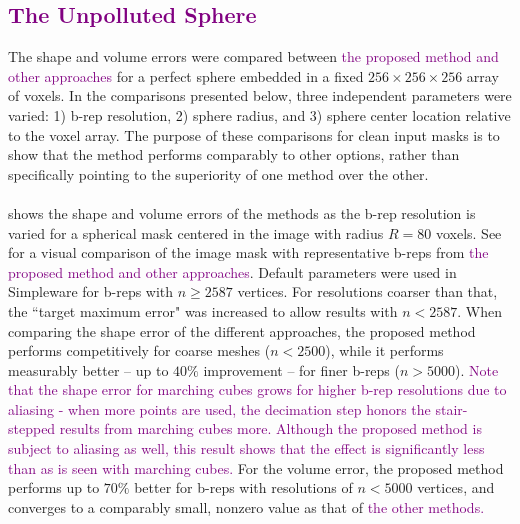 \subsection{\textcolor{purple}{The Unpolluted Sphere}}
\label{The Unpolluted Sphere}

The shape and volume errors were compared between \textcolor{purple}{the proposed method and other approaches} for a perfect sphere embedded in a fixed $256 \times 256 \times 256$ array of voxels.  In the comparisons presented below, three independent parameters were varied:  1) b-rep resolution, 2) sphere radius, and 3) sphere center location relative to the voxel array. The purpose of these comparisons for clean input masks is to show that the method performs comparably to other options, rather than specifically pointing to the superiority of one method over the other. \\ \\
%
 shows the shape and volume errors of the methods as the b-rep resolution is varied for a spherical mask centered in the image with radius $R = 80$ voxels. See~ for a visual comparison of the image mask with representative b-reps from \textcolor{purple}{the proposed method and other approaches}. Default parameters were used in Simpleware for b-reps with $n \ge 2587$ vertices. For resolutions coarser than that, the ``target maximum error" was increased to allow results with $n < 2587$. When comparing the shape error of the different approaches, the proposed method performs competitively for coarse meshes ($n < 2500$), while it performs measurably better -- up to $40\%$ improvement -- for finer b-reps ($n > 5000$). \textcolor{purple}{Note that the shape error for marching cubes grows for higher b-rep resolutions due to aliasing - when more points are used, the decimation step honors the stair-stepped results from marching cubes more. Although the proposed method is subject to aliasing as well, this result shows that the effect is significantly less than as is seen with marching cubes.} For the volume error, the proposed method performs up to $70\%$ better for b-reps with resolutions of $n < 5000$ vertices, and converges to a comparably small, nonzero value as that of \textcolor{purple}{the other methods.} \\
